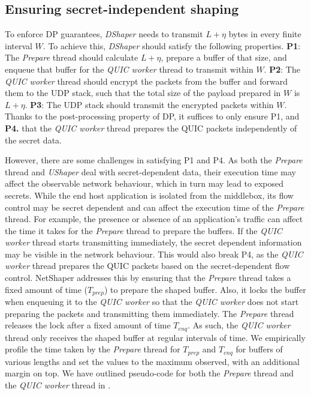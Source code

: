 \subsection{Ensuring secret-independent shaping}
\label{subsec:netshaper-secret-independent-shaping-implementation}

To enforce DP guarantees, \textit{DShaper} needs to transmit $L + \eta$ bytes in every finite interval $W$.
To achieve this, \textit{DShaper} should satisfy the following properties.
\textbf{P1}: The \textit{Prepare} thread should calculate $L + \eta$, prepare a buffer of that size, and enqueue that buffer for the \textit{QUIC worker} thread to transmit within $W$.
\textbf{P2}: The \textit{QUIC worker} thread should encrypt the packets from the buffer and forward them to the UDP stack, such that the total size of the payload prepared in $W$ is $L + \eta$.
\textbf{P3}: The UDP stack should transmit the encrypted packets within $W$.
Thanks to the post-processing property of DP, it suffices to only ensure P1, and \textbf{P4.} that the \textit{QUIC worker} thread prepares the QUIC packets independently of the secret data.

However, there are some challenges in satisfying P1 and P4.
As both the \textit{Prepare} thread and \textit{UShaper} deal with secret-dependent data, their execution time may affect the observable network behaviour, which in turn may lead to exposed secrets.
While the end host application is isolated from the middlebox, its flow control may be secret dependent and can affect the execution time of the \textit{Prepare} thread.
For example, the presence or absence of an application's traffic can affect the time it takes for the \textit{Prepare} thread to prepare the buffers.
If the \textit{QUIC worker} thread starts transmitting immediately, the secret dependent information may be visible in the network behaviour. 
This would also break P4, as the \textit{QUIC worker} thread prepares the QUIC packets based on the secret-dependent flow control.
NetShaper addresses this by ensuring that the \textit{Prepare} thread takes a fixed amount of time ($T_{prep}$) to prepare the shaped buffer.
Also, it locks the buffer when enqueuing it to the \textit{QUIC worker} so that the \textit{QUIC worker} does not start preparing the packets and transmitting them immediately.
The \textit{Prepare} thread releases the lock after a fixed amount of time $T_{enq}$.
As such, the \textit{QUIC worker} thread only receives the shaped buffer at regular intervals of time.
We empirically profile the time taken by the \textit{Prepare} thread for $T_{prep}$ and $T_{enq}$ for buffers of various lengths and set the values to the maximum observed, with an additional margin on top.
We have outlined pseudo-code for both the \textit{Prepare} thread and the \textit{QUIC worker} thread in .


